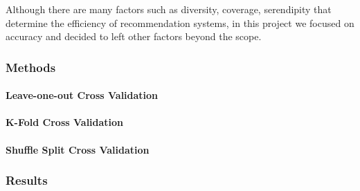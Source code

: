 	Although there are many factors such as diversity, coverage, serendipity that determine the efficiency of recommendation systems, in this project we focused on accuracy and decided to left other factors beyond the scope.
	\subsubsection{Methods}
	\paragraph{Leave-one-out Cross Validation}
	\paragraph{K-Fold Cross Validation}
	\paragraph{Shuffle Split Cross Validation}
	\subsubsection{Results}
